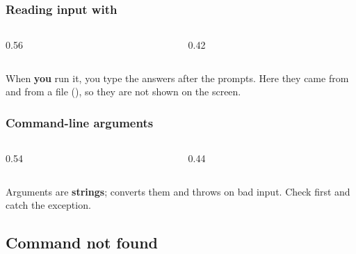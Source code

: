 \documentclass[aspectratio=169,10pt,compress]{beamer}
\begin{document}
\begin{frame}[t,fragile] \frametitle{Reading input with }
  \begin{columns}[T]
    \begin{column}{0.56\textwidth}
    \end{column}
    \begin{column}{0.42\textwidth}
    \end{column}
  \end{columns}

  \vspace{0.1em}
  \small When \textbf{you} run it, you type the answers after the prompts. Here they came from  and from a file
  (), so they are not shown on the screen.
\end{frame}




\begin{frame}[t,fragile] \frametitle{Command-line arguments}
  \begin{columns}[T]
    \begin{column}{0.54\textwidth}
    \end{column}
    \begin{column}{0.44\textwidth}
    \end{column}
  \end{columns}

  \vspace{0.1em}
  \small Arguments are \textbf{strings};  converts them and throws  on bad input.
  Check  first and catch the exception.
\end{frame}


\subsection[Not found]{Command not found}
\end{document}
